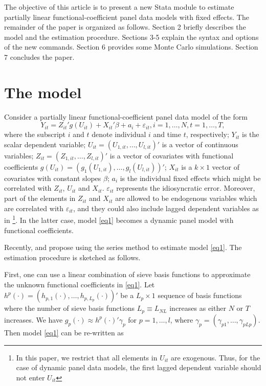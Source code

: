 The objective of this article is to present a new Stata module to estimate partially linear functional-coefficient panel data models with fixed effects. The remainder of the paper is organized as follows. Section 2 briefly describes the model and the estimation procedure. Sections 3-5 explain the syntax and options of the new commands. Section 6 provides some Monte Carlo simulations. Section 7 concludes the paper.

\section{The model}

Consider a partially linear functional-coefficient panel data model of the form
\begin{equation}
Y_{it}=Z_{it}'g(U_{it})+X_{it}'\beta+a_{i}+\varepsilon_{it},i=1,\dots,N, t=1,\dots, T, \label{eq1}
\end{equation}
where the subscript $i$ and $t$ denote individual $i$ and time $t$, respectively; $Y_{it}$ is the scalar dependent variable; $U_{it}=(U_{1,it},\dots,U_{l,it})'$ is a vector of continuous variables; $Z_{it}=(Z_{1,it},\dots,Z_{l,it})'$ is a vector of covariates with functional coefficients $g(U_{it})=(g_{1}(U_{1,it}),\dots,g_{l}(U_{l,it}))'$; $X_{it}$ is a $k \times 1$ vector of covariates with constant slopes $\beta$; $a_{i}$ is the individual fixed effects which might be correlated with $Z_{it}$, $U_{it}$ and $X_{it}$. $\varepsilon_{it}$ represents the idiosyncratic error. Moreover, part of the elements in $Z_{it}$ and $X_{it}$ are allowed to be endogenous variables which are correlated with $\varepsilon_{it}$, and they could also include lagged dependent variables as in \citet{Zhang2018}\footnote{In this paper, we restrict that all elements in $U_{it}$ are exogenous. Thus, for the case of dynamic panel data models, the first lagged dependent variable should not enter $U_{it}$}. In the latter case, model \eqref{eq1} becomes a dynamic panel model with functional coefficients.


Recently, \citet{yonghong2016semiparametric} and \citet{Zhang2018} propose using the series method to estimate model \eqref{eq1}. The estimation procedure is sketched as follows.

First, one can use a linear combination of sieve basis functions to approximate the unknown functional coefficients in \eqref{eq1}. Let $h^{p}(\cdot)=(h_{p,1}(\cdot),\dots,h_{p,L_{p}}(\cdot))'$ be a $L_{p} \times 1$ sequence of basis functions where the number of sieve basis functions $L_{p} \equiv L_{NL}$ increases as either $N$ or $T$ increases. We have $g_{p}(\cdot) \approx h^{p}(\cdot)'\gamma_{p}$ for $p=1,\dots,l$, where $\gamma_{p}=(\gamma_{p1},\dots,\gamma_{pL{p}})$. Then model \eqref{eq1} can be re-written as

